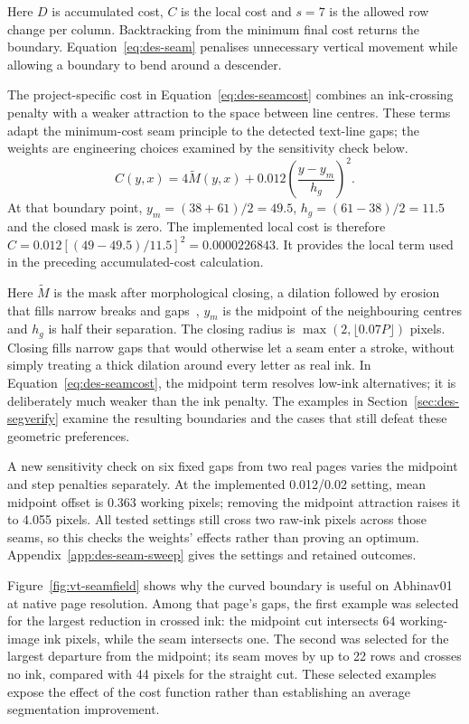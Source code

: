 Here $D$ is accumulated cost, $C$ is the local cost and $s=7$ is the allowed row change per column. Backtracking from the minimum final cost returns the boundary. Equation~\ref{eq:des-seam} penalises unnecessary vertical movement while allowing a boundary to bend around a descender.

The project-specific cost in Equation~\ref{eq:des-seamcost} combines an ink-crossing penalty with a weaker attraction to the space between line centres. These terms adapt the minimum-cost seam principle to the detected text-line gaps; the weights are engineering choices examined by the sensitivity check below.
\begin{equation}
C(y,x)=4\widetilde M(y,x)
+0.012\left(\frac{y-y_m}{h_g}\right)^2.
\label{eq:des-seamcost}
\end{equation}
At that boundary point, $y_m=(38+61)/2=49.5$, $h_g=(61-38)/2=11.5$ and the closed mask is zero. The implemented local cost is therefore $C=0.012[(49-49.5)/11.5]^2=0.0000226843$. It provides the local term used in the preceding accumulated-cost calculation.

Here $\widetilde M$ is the mask after morphological closing, a dilation followed by erosion that fills narrow breaks and gaps~\cite[p.~541]{haralick1987}, $y_m$ is the midpoint of the neighbouring centres and $h_g$ is half their separation. The closing radius is $\max(2,\lfloor0.07P\rfloor)$ pixels. Closing fills narrow gaps that would otherwise let a seam enter a stroke, without simply treating a thick dilation around every letter as real ink. In Equation~\ref{eq:des-seamcost}, the midpoint term resolves low-ink alternatives; it is deliberately much weaker than the ink penalty. The examples in Section~\ref{sec:des-segverify} examine the resulting boundaries and the cases that still defeat these geometric preferences.

A new sensitivity check on six fixed gaps from two real pages varies the midpoint and step penalties separately. At the implemented 0.012/0.02 setting, mean midpoint offset is 0.363 working pixels; removing the midpoint attraction raises it to 4.055 pixels. All tested settings still cross two raw-ink pixels across those seams, so this checks the weights' effects rather than proving an optimum. Appendix~\ref{app:des-seam-sweep} gives the settings and retained outcomes.

Figure~\ref{fig:vt-seamfield} shows why the curved boundary is useful on Abhinav01 at native page resolution. Among that page's gaps, the first example was selected for the largest reduction in crossed ink: the midpoint cut intersects 64 working-image ink pixels, while the seam intersects one. The second was selected for the largest departure from the midpoint; its seam moves by up to 22 rows and crosses no ink, compared with 44 pixels for the straight cut. These selected examples expose the effect of the cost function rather than establishing an average segmentation improvement.

